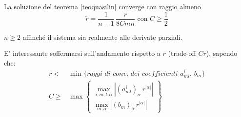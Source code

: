 \begin{theorem}\label{stimaraggio}
La soluzione del teorema \ref{teoquasilin} converge con raggio almeno
$$\widetilde{r} = \dfrac{1}{n-1}\, \dfrac{r}{8Cmn} \text{ con } C \geq \frac{1}{2}$$
\end{theorem}
\begin{remark}
$n \geq 2$ affinché il sistema sia realmente alle derivate parziali. 
\end{remark}
\begin{remark}
E' interessante soffermarsi sull'andamento rispetto a $r$ (trade-off $Cr$), sapendo che:
\begin{align}\label{r}
r <& \min \{ \textit{raggi di conv. dei coefficienti } a^i_{ml}, \, b_m\} \\
\label{C}
C \geq & \max \begin{Bmatrix}
\max\limits_{i,m,l,\alpha } \left| (a^i_{ml})_\alpha \, r^{|\alpha |}\right|\\
\max\limits_{m,\alpha} \left|(b_m)_\alpha \, r^{|\alpha |}\right|
\end{Bmatrix}
\end{align}
\end{remark}


